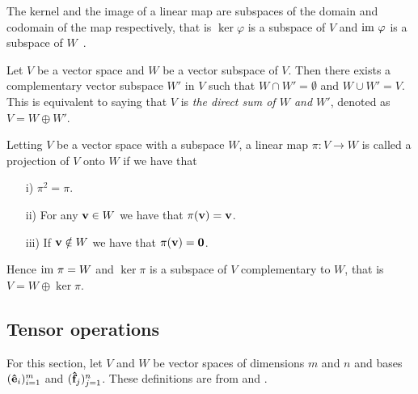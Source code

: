 	\begin{remark}
		The kernel and the image of a linear map are subspaces of the domain and codomain of the map respectively, that is $\ker \varphi$ is a subspace of $V$ and $\text{im } \varphi$ is a subspace of $W$~\cite[Sect.5.4.]{Holst}.
	\end{remark}	
	
	\begin{theorem}\label{thm:compsubspaces}\cite[Thm.12.16]{Holst}
		Let $V$ be a vector space and $W$ be a vector subspace of $V$. Then there exists a complementary vector subspace $W'$ in $V$ such that $W \cap W' = \emptyset$ and $W \cup W' = V$. This is equivalent to saying that $V$ is \textit{the direct sum of $W$ and $W'$}, denoted as $V = W \oplus W'$.
	\end{theorem}
	
\begin{example}
		Letting $V$ be a vector space with a subspace $W$, a linear map $\pi: V \rightarrow W$ is called a projection of $V$ onto $W$ if we have that
	\begin{enumerate}
		\item[i)]  $\pi^2 = \pi$.
		\item[ii)] For any $\mathbf{v} \in W$ we have that $\pi(\mathbf{v}) = \mathbf{v}$.
		\item[iii)] If $\mathbf{v} \notin W$ we have that $\pi(\mathbf{v}) = \mathbf{0}$. 
	\end{enumerate}
	Hence $\text{im } \pi = W$ and $\ker \pi$ is a subspace of $V$ complementary to $W$, that is $V  = W \oplus \ker \pi$.
\end{example}
		
\subsection{Tensor operations}\label{sect:tensoralgebra}

For this section, let $V$ and $W$ be vector spaces of dimensions $m$ and $n$ and bases $(\mathbf{\hat{e}}_i)_{i=1}^m$ and $(\mathbf{\hat{f}}_j)_{j=1}^n$. These definitions are from \cite{Jeevanjee} and \cite{Yokonuma}.
	
